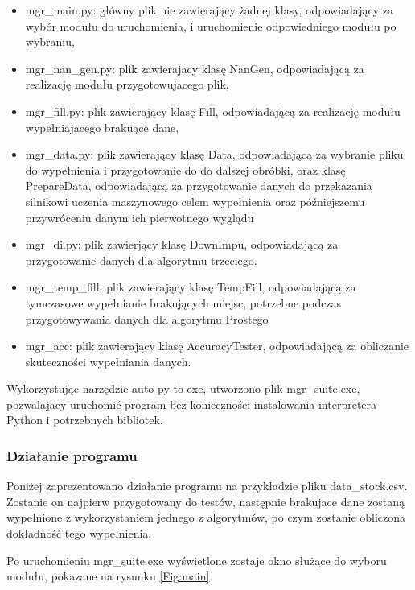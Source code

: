 \documentclass[12pt,twoside]{article}
\begin{document}
\begin{itemize}[label=-,labelsep=0.4cm, leftmargin=1.25cm]
    \item mgr\_main.py: główny plik nie zawierający żadnej klasy, odpowiadający za wybór modułu do uruchomienia,
          i uruchomienie odpowiedniego modułu po wybraniu,
    \item mgr\_nan\_gen.py: plik zawierajacy klasę NanGen, odpowiadającą za realizację modułu przygotowujacego plik,
    \item mgr\_fill.py: plik zawierający klasę Fill, odpowiadającą za realizację modułu wypełniajacego brakuące dane,
    \item mgr\_data.py: plik zawierający klasę Data,
          odpowiadającą za wybranie pliku do wypełnienia i przygotowanie do do dalszej obróbki, oraz klasę PrepareData,
          odpowiadającą za przygotowanie danych do przekazania silnikowi uczenia maszynowego celem wypełnienia
          oraz późniejszemu przywróceniu danym ich pierwotnego wyglądu
    \item mgr\_di.py: plik zawierjący klasę DownImpu,
          odpowiadającą za przygotowanie danych dla algorytmu trzeciego.
    \item mgr\_temp\_fill: plik zawierający klasę TempFill, odpowiadającą za tymczasowe wypełnianie brakujących miejsc,
          potrzebne podczas przygotowywania danych dla algorytmu Prostego
    \item mgr\_acc: plik zawierający klasę AccuracyTester, odpowiadającą za obliczanie skuteczności wypełniania danych.
\end{itemize}

Wykorzystując narzędzie auto-py-to-exe, utworzono plik mgr\_suite.exe,
pozwalajacy uruchomić program bez konieczności instalowania interpretera Python i potrzebnych bibliotek. \cite{autopy}
\subsubsection{Działanie programu}
Poniżej zaprezentowano działanie programu na przykładzie pliku data\_stock.csv.
Zostanie on najpierw przygotowany do testów,
następnie brakujace dane zostaną wypełnione z wykorzystaniem jednego z algorytmów,
po czym zostanie obliczona dokładność tego wypełnienia.

\vspace{5mm}
Po uruchomieniu mgr\_suite.exe wyświetlone zostaje okno służące do wyboru modułu, pokazane na rysunku \ref{Fig:main}.
\end{document}
